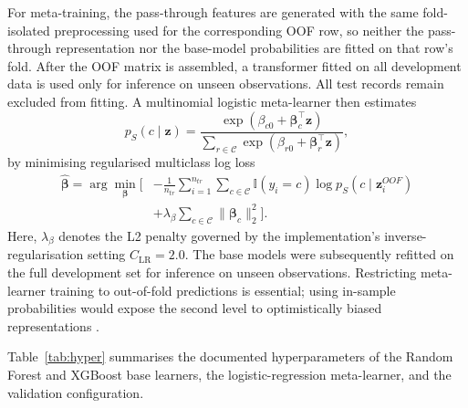 \documentclass[a4paper,fleqn]{cas-dc}
\begin{document}
For meta-training, the pass-through features are generated with the same fold-isolated preprocessing used for the corresponding OOF row, so neither the pass-through representation nor the base-model probabilities are fitted on that row's fold. After the OOF matrix is assembled, a transformer fitted on all development data is used only for inference on unseen observations. All test records remain excluded from fitting. A multinomial logistic meta-learner then estimates
\begin{equation}
p_{S}(c\mid\mathbf{z})=
\frac{\exp(\beta_{c0}+\boldsymbol{\beta}_c^{\top}\mathbf{z})}
{\sum_{r\in\mathcal{C}}\exp(\beta_{r0}+\boldsymbol{\beta}_r^{\top}\mathbf{z})},
\label{eq:meta}
\end{equation}
by minimising regularised multiclass log loss
\begin{equation}
\begin{aligned}
\widehat{\boldsymbol{\beta}}=\arg\min_{\boldsymbol{\beta}}\Biggl[&
-\frac{1}{n_{tr}}\sum_{i=1}^{n_{tr}}\sum_{c\in\mathcal{C}}
\mathbb{I}(y_i=c)\log p_S(c\mid\mathbf{z}^{OOF}_i)\\
&+\lambda_{\beta}\sum_{c\in\mathcal{C}}\lVert\boldsymbol{\beta}_c\rVert_2^2\Biggr].
\end{aligned}
\label{eq:metaloss}
\end{equation}
Here, $\lambda_{\beta}$ denotes the L2 penalty governed by the implementation's inverse-regularisation setting $C_{\mathrm{LR}}=2.0$. The base models were subsequently refitted on the full development set for inference on unseen observations. Restricting meta-learner training to out-of-fold predictions is essential; using in-sample probabilities would expose the second level to optimistically biased representations \cite{kapoor2023,alabi2023}.

Table~\ref{tab:hyper} summarises the documented hyperparameters of the Random Forest and XGBoost base learners, the logistic-regression meta-learner, and the validation configuration.
\end{document}
